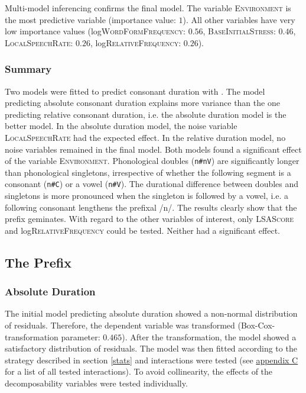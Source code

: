 Multi-model inferencing confirms the final model. The variable \textsc{Environment} is the most predictive variable (importance value: $1$). All other variables have very low importance values  (log\textsc{WordFormFrequency}: $0.56$, \textsc{BaseInitialStress}: $0.46$, \textsc{LocalSpeechRate}: $0.26$, log\textsc{RelativeFrequency}: $0.26$).


\subsubsection{Summary}

Two models were fitted to predict consonant duration with  . The model predicting absolute consonant duration explains more variance than the one predicting relative consonant duration, i.e. the absolute duration model is the better model. In the absolute duration model, the noise variable \textsc{LocalSpeechRate} had the expected effect. In the relative duration model, no noise variables remained in the final model.
 Both models found a significant effect of the variable \textsc{Environment}. Phonological doubles (\texttt{n\#nV}) are significantly longer than phonological singletons, irrespective of whether the following segment is a consonant (\texttt{n\#C}) or a vowel (\texttt{n\#V}). The durational difference between doubles and singletons is more pronounced when the singleton is followed by a vowel, i.e. a following consonant lengthens the prefixal /n/. The results clearly show that the prefix  geminates.
With regard to the other variables of interest, only \textsc{LSAScore} and log\textsc{RelativeFrequency} could be tested. Neither had a significant effect. 


\subsection{The Prefix } \label{in corpus}


\subsubsection{Absolute Duration}

The initial model predicting absolute duration showed a non-normal distribution of residuals. Therefore, the dependent variable was  transformed (Box-Cox-transformation  parameter: $0.465$). After the transformation, the model showed a satisfactory distribution of residuals. The model was then fitted according to the strategy described in section \ref{stats} and interactions were tested (see \hyperref[Appendix C: Summaries of tested interactions in corpus study]{appendix C} for a list of all tested interactions). 
To avoid collinearity, the effects of the decomposability variables were tested individually.


